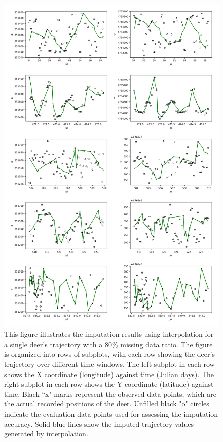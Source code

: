 \documentclass[11pt]{article}
\begin{document}
\begin{figure}[h]
  \centering
  \includegraphics[width=\textwidth]{../figure/80_5094_interpolation} %
  \caption{This figure illustrates the imputation results using interpolation for a single deer's trajectory with a 80\% missing data ratio. The figure is organized into rows of subplots, with each row showing the deer's trajectory over different time windows. The left subplot in each row shows the X coordinate (longitude) against time (Julian days). The right subplot in each row shows the Y coordinate (latitude) against time. Black ``x" marks represent the observed data points, which are the actual recorded positions of the deer. Unfilled black "o" circles indicate the evaluation data points used for assessing the imputation accuracy. Solid blue lines show the imputed trajectory values generated by interpolation.}
  \label{fig: interpolation_80} %
\end{figure}
\end{document}
